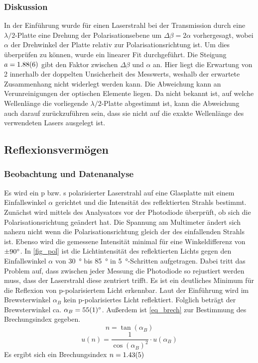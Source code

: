 \documentclass[
	a4paper,
	12pt,
	pagesize,
	ngerman
]{scrartcl}
\begin{document}
	\subsubsection{Diskussion}
	In der Einführung wurde für einen Laserstrahl bei der Transmission durch eine $\lambda/2$-Platte eine Drehung der Polarisationsebene um $\Delta\beta=2\alpha$ vorhergesagt, wobei $\alpha$ der Drehwinkel der Platte relativ zur Polarisationsrichtung ist.
	Um dies überprüfen zu können, wurde ein linearer Fit durchgeführt.
	Die Steigung $a=\SI{1,88+-0,06}{}$ gibt den Faktor zwischen $\Delta\beta$ und $\alpha$ an.
	Hier liegt die Erwartung von 2 innerhalb der doppelten Unsicherheit des Messwerts, weshalb der erwartete Zusammenhang nicht widerlegt werden kann.
	Die Abweichung kann an Verunreinigungen der optischen Elemente liegen.
	Da nicht bekannt ist, auf welche Wellenlänge die vorliegende $\lambda /2$-Platte abgestimmt ist, kann die Abweichung auch darauf zurückzuführen sein, dass sie nicht auf die exakte Wellenlänge des verwendeten Lasers ausgelegt ist.
	
	\subsection{Reflexionsvermögen}
	\subsubsection{Beobachtung und Datenanalyse}
	Es wird ein p bzw. s polarisierter Laserstrahl auf eine Glasplatte mit einem Einfallswinkel $\alpha$ gerichtet und die Intensität des reflektierten Strahls bestimmt.
	Zunächst wird mittels des Analysators vor der Photodiode überprüft, ob sich die Polarisationsrichtung geändert hat. 
	Die Spannung am Multimeter ändert sich nahezu nicht wenn die Polarisationsrichtung gleich der des einfallenden Strahls ist. 
	Ebenso wird die gemessene Intensität minimal für eine Winkeldifferenz von $\SI{\pm90}{\degree}$.
	In \cref{fig_pol} ist die Lichtintensität des reflektierten Lichts gegen den Einfallswinkel $\alpha$ von \SI{30}{\degree} bis \SI{85}{\degree} in \SI{5}{\degree}-Schritten aufgetragen.
	Dabei tritt das Problem auf, dass zwischen jeder Messung die Photodiode so rejustiert werden muss, dass der Laserstrahl diese zentriert trifft.
	Es ist ein deutliches Minimum für die Reflexion von p-polarisiertem Licht erkennbar.
	Laut der Einführung wird im Brewsterwinkel $\alpha_B$ kein p-polarisiertes Licht reflektiert.
	Folglich beträgt der Brewsterwinkel ca. $\alpha_B = \SI{55+-1}{\degree}$.
	Außerdem ist \cref{eq_brech} zur Bestimmung des Brechungsindex gegeben.
	\begin{equation}
		n= \tan(\alpha_B)
		\label{eq_brech}
	\end{equation}
	\begin{equation}
		u(n) = \frac{1}{\cos(\alpha_B)^2} \cdot u(\alpha_B)
		\label{eq_unsicher}
	\end{equation}
	Es ergibt sich ein Brechungsindex $n = \SI{1,43 +- 0,05}{}$
\end{document}

